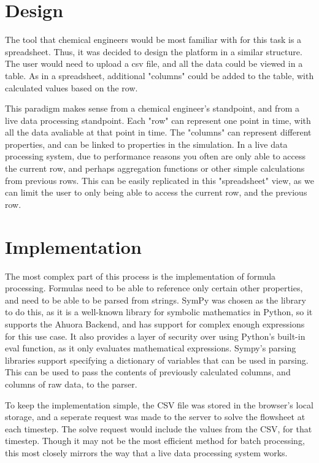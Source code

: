 \section{Design}
The tool that chemical engineers would be most familiar with for this task is a spreadsheet. 
Thus, it was decided to design the platform in a similar structure. The user would need to upload a csv file, and all the data could be viewed in a table. 
As in a spreadsheet, additional "columns" could be added to the table, with calculated values based on the row.

This paradigm makes sense from a chemical engineer's standpoint, and from a live data processing standpoint. Each "row" can represent one point in time, with all the data avaliable at that point in time. The "columns" can represent different properties, and can be linked to properties in the simulation. In a live data processing system, due to performance reasons you often are only able to access the current row, and perhaps aggregation functions or other simple calculations from previous rows. This can be easily replicated in this "spreadsheet" view, as we can limit the user to only being able to access the current row, and the previous row.

\section{Implementation}

The most complex part of this process is the implementation of formula processing. Formulas need to be able to reference only certain other properties, and need to be able to be parsed from strings. SymPy was chosen as the library to do this, as it is a well-known library for symbolic mathematics in Python, so it supports the Ahuora Backend, and has support for complex enough expressions for this use case. It also provides a layer of security over using Python's built-in eval function, as it only evaluates mathematical expressions.
Sympy's parsing libraries support specifying a dictionary of variables that can be used in parsing. This can be used to pass the contents of previously calculated columns, and columns of raw data, to the parser. 

To keep the implementation simple, the CSV file was stored in the browser's local storage, and a seperate request was made to the server to solve the flowsheet at each timestep. The solve request would include the values from the CSV, for that timestep. Though it may not be the most efficient method for batch processing, this most closely mirrors the way that a live data processing system works. 

